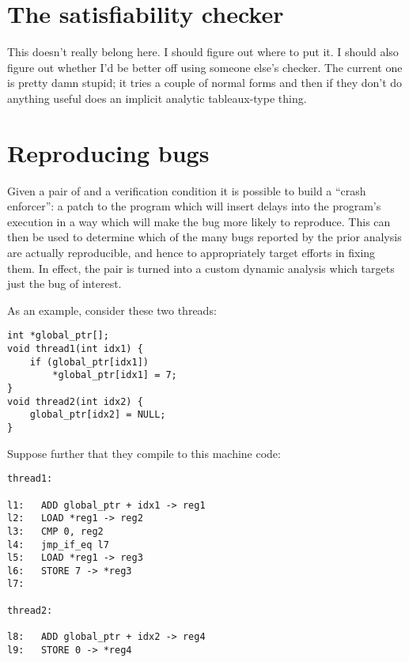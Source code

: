 \section{The satisfiability checker}
This doesn't really belong here.  I should figure out where to put it.
I should also figure out whether I'd be better off using someone
else's checker.  The current one is pretty damn stupid; it tries a
couple of normal forms and then if they don't do anything useful does
an implicit analytic tableaux-type thing.

\section{Reproducing bugs}
\label{sect:reproducing_bugs}



Given a pair of {\StateMachines} and a verification condition it is
possible to build a ``crash enforcer'': a patch to the program which
will insert delays into the program's execution in a way which will
make the bug more likely to reproduce.  This can then be used to
determine which of the many bugs reported by the prior analysis are
actually reproducible, and hence to appropriately target efforts in
fixing them.  In effect, the {\StateMachine} pair is turned into a
custom dynamic analysis which targets just the bug of interest.

As an example, consider these two threads:

\begin{verbatim}
int *global_ptr[];
void thread1(int idx1) {
    if (global_ptr[idx1])
        *global_ptr[idx1] = 7;
} 
void thread2(int idx2) {
    global_ptr[idx2] = NULL;
}
\end{verbatim}

Suppose further that they compile to this machine code:

\begin{verbatim}
thread1:

l1:   ADD global_ptr + idx1 -> reg1
l2:   LOAD *reg1 -> reg2
l3:   CMP 0, reg2
l4:   jmp_if_eq l7
l5:   LOAD *reg1 -> reg3
l6:   STORE 7 -> *reg3
l7:

thread2:

l8:   ADD global_ptr + idx2 -> reg4
l9:   STORE 0 -> *reg4
\end{verbatim}

